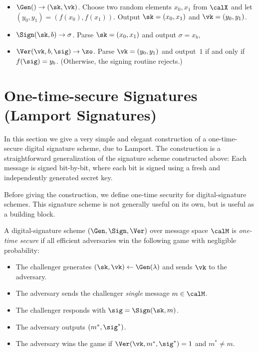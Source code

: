 \begin{itemize}
  \item $\Gen() \to (\sk, \vk)$. 
    Choose two random elements $x_0, x_1$ from $\calX$ and let $(y_0,y_1)=(f(x_0),f(x_1))$.  Output $\sk=(x_0,x_1)$ and $\vk=(y_0,y_1)$.
    
	\item $\Sign(\sk, b) \to \sigma$.  Parse $\sk=(x_0,x_1)$ and output $\sigma=x_b$, 
	\item $\Ver(\vk, b, \sig) \to \zo$. Parse $\vk=(y_0,y_1)$ and output~$1$ if and only if $f(\sig)=y_b$. 
    (Otherwise, the signing routine rejects.)
\end{itemize}


\section{One-time-secure Signatures (Lamport Signatures)} \label{sec:lamport}

In this section we give a very simple and elegant construction 
of a one-time-secure digital signature scheme, due to Lamport.\autocite{L79}
The construction is a straightforward generalization of  the signature scheme constructed above:  Each message is signed bit-by-bit, where each bit is signed using a fresh and independently generated secret key. 


Before giving the construction, we define one-time security for 
digital-signature schemes.
This signature scheme is not generally useful on its own, but is
useful as a building block.

\begin{definition}\label{def:sig-once}
A digital-signature scheme $(\Gen, \Sign, \Ver)$ over message space $\calM$ is \emph{one-time secure} if all efficient adversaries win
the following game with negligible probability:
  \begin{itemize}[noitemsep]
    \item The challenger generates $(\sk, \vk) \leftarrow \Gen(\lambda)$ and sends $\vk$ to the adversary.
    \item The adversary sends the challenger \emph{single} message $m \in \calM$.
    \item The challenger responds with $\sig = \Sign(\sk, m)$.
    \item The adversary outputs $(m^*, \sig^*)$.
    \item The adversary wins the game if $\Ver(\vk, m^*, \sig^*) = 1$ and $m^* \neq m$.
\end{itemize}
\end{definition}

